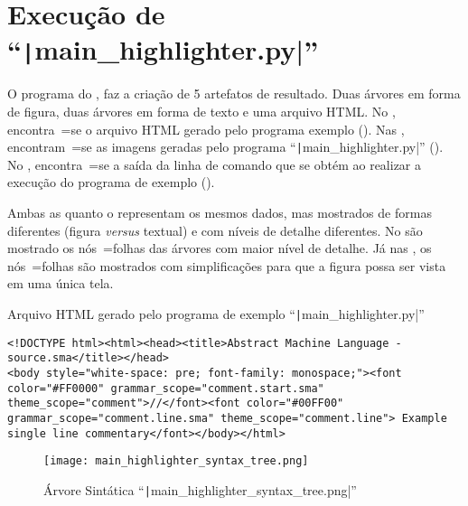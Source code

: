 \chapter[main\_highlighter.py]{Execução de ``\texttt|main_highlighter.py|''}

O programa do ,
faz a criação de 5 artefatos de resultado.
Duas árvores em forma de figura,
duas árvores em forma de texto e
uma arquivo HTML.
No ,
encontra~=se o arquivo HTML gerado pelo programa exemplo ().
Nas ,
encontram~=se as imagens geradas pelo programa ``\texttt|main_highlighter.py|'' ().
No ,
encontra~=se a saída da linha de comando que se obtém ao realizar a execução do programa de exemplo ().

Ambas as  quanto o  representam os mesmos dados,
mas mostrados de formas diferentes (figura \textit{versus} textual) e
com níveis de detalhe diferentes.
No  são mostrado os nós~=folhas das árvores com maior nível de detalhe.
Já nas ,
os nós~=folhas são mostrados com simplificações para que a figura possa ser vista em uma única tela.
\begin{code}
\caption[Arquivo HTML gerado pelo programa de exemplo ``main\_highlighter.py'']{Arquivo HTML gerado pelo programa de exemplo ``\texttt|main_highlighter.py|''}
\label{code:MainHighlighterHtml}
\begin{verbatim}
<!DOCTYPE html><html><head><title>Abstract Machine Language - source.sma</title></head>
<body style="white-space: pre; font-family: monospace;"><font color="#FF0000" grammar_scope="comment.start.sma" theme_scope="comment">//</font><font color="#00FF00" grammar_scope="comment.line.sma" theme_scope="comment.line"> Example single line commentary</font></body></html>
\end{verbatim}
\end{code}

\begin{figure}[!htb]
\caption[Árvore Sintática ``main\_highlighter\_syntax\_tree.png'']{Árvore Sintática ``\texttt|main_highlighter_syntax_tree.png|''}
\label{figure:MainHighlighterSyntaxTree}
\centering
\texttt{[image: main\_highlighter\_syntax\_tree.png]}
\end{figure}

